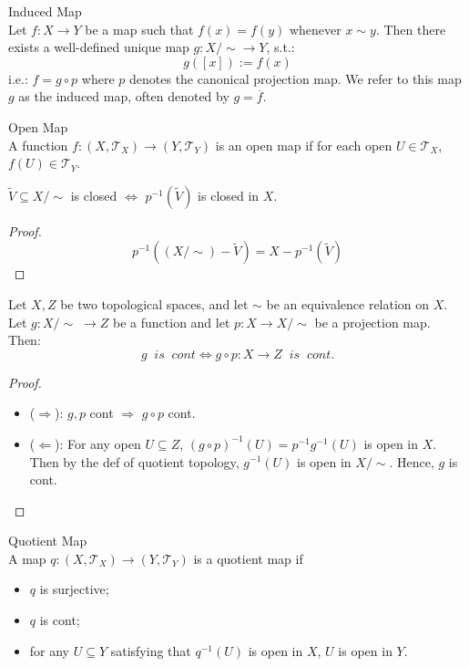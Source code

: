\begin{definition}{Induced Map}\\
Let $f: X \to Y$ be a map such that $f(x)=f(y)$ whenever $x \sim y$. Then there exists a well-defined unique map $g: X/\sim \to Y$, s.t.:
$$g([x]) := f(x)$$
i.e.: $f= g \circ p$ where $p$ denotes the canonical projection map. We refer to this map $g$ as the induced map, often denoted by $g= \overline{f}$.
\end{definition}

\begin{definition}{Open Map}\\
A function $f : (X,\mathcal{T}_X) \rightarrow (Y,\mathcal{T}_Y)$ is an open map if for each open $U \in \mathcal{T}_X$, $f(U) \in \mathcal{T}_Y$.
\end{definition}

\begin{proposition}
    $\widetilde{V} \subseteq X/\sim$ is closed $\Leftrightarrow$ $p^{-1} (\widetilde{V})$ is closed in $X$.
\end{proposition}

\begin{proof}
    $$p^{-1} ((X/\sim) - \widetilde{V}) = X - p^{-1} (\widetilde{V})$$
\end{proof}

\begin{proposition}
    Let $X,Z$ be two topological spaces, and let $\sim$ be an equivalence relation on $X$. Let $g : X/\sim \;\rightarrow Z$ be a function and let $p: X\rightarrow X/\sim$ be a projection map. Then:
    $$g \;\; is \;\; cont \Leftrightarrow g\circ p : X\rightarrow Z \;\; is \;\; cont.$$
\end{proposition}

\begin{proof}
    \begin{itemize}
        \item ($\Rightarrow$): $g,p$ cont $\Rightarrow$ $g\circ p$ cont.
        \item ($\Leftarrow$): For any open $U \subseteq Z$, $(g\circ p)^{-1} (U) = p^{-1}g^{-1} (U)$ is open in $X$. Then by the def of quotient topology, $g^{-1} (U)$ is open in $X/\sim$. Hence, $g$ is cont.
    \end{itemize}
\end{proof}

\begin{definition}{Quotient Map}\\
A map $q : (X,\mathcal{T}_X) \rightarrow (Y,\mathcal{T}_Y)$ is a quotient map if
\begin{itemize}
    \item $q$ is surjective;
    \item $q$ is cont;
    \item for any $U \subseteq Y$ satisfying that $q^{-1}(U)$ is open in $X$, $U$ is open in $Y$.
\end{itemize}
\end{definition}

